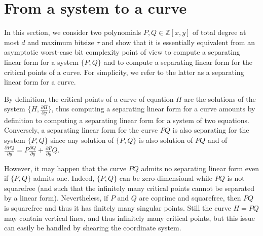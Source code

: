\documentclass{sig-alternate}
\newcommand {\Z}   {\mathbb Z}
\newcommand{\blue}[1]{\color{blue}#1\color{black}\xspace}
\renewcommand{\blue}[1]{#1\xspace}
\begin{document}
\section{From a system to a curve}\label{sec:PQ_curve}

In this section, we consider two polynomials $P,Q \in \Z[x,y]$ of total degree at most $d$ and maximum bitsize $\tau$ and show that it is essentially equivalent from an asymptotic worst-case bit
complexity point of view to compute a separating linear form for a system $\{P,Q\}$ and  to compute a
separating linear form for the critical points of a curve.  For simplicity, we refer to the latter
as a separating linear form for a curve.  

By definition, the critical points of a
curve of equation $H$ are the solutions of the system $\{H,\frac{\partial H}{\partial y}\}$, thus
computing a separating linear form for a curve amounts by definition to computing a
separating linear form for a system of two equations. Conversely, a separating linear form for the curve $PQ$ is also separating for
the system $\{P,Q\}$ since any solution of $\{P,Q\}$ is also solution of $PQ$ and of
$\frac{\partial PQ}{\partial y}=P\frac{\partial Q}{\partial y}+ \frac{\partial P}{\partial y}
Q$. 

However, it may happen that the curve $PQ$ admits no separating linear form even
if $\{P,Q\}$ admits one. Indeed, $\{P,Q\}$ can be zero-dimensional while $PQ$ is
not squarefree (and such that the infinitely many critical points cannot be
separated by a linear form).  Nevertheless, if $P$ and $Q$ are coprime and
squarefree, then $PQ$ is squarefree and thus it has finitely many singular
points.
\blue{Still the curve $H=PQ$ may contain vertical lines, and thus infinitely many
critical points, but this issue can easily be handled by shearing the coordinate
system.}
\end{document}

